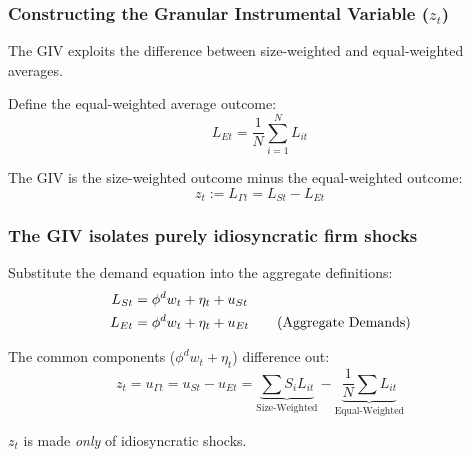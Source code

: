 \documentclass[aspectratio=169,11pt]{beamer}
\begin{document}
\begin{frame}
    \frametitle{Constructing the Granular Instrumental Variable ($z_t$)}

    \vspace{0.5cm}
    {\Large
        The GIV exploits the difference between size-weighted and equal-weighted averages.
    }

    \vspace{1cm}
    Define the equal-weighted average outcome:
    \begin{equation}
        L_{Et} = \frac{1}{N} \sum_{i=1}^N L_{it} \tag{Equal-Weighted Average} \label{eq:equal_weight_avg}
    \end{equation}

    \vspace{0.5cm}
    The GIV is the size-weighted outcome minus the equal-weighted outcome:
    \begin{equation}
        z_t := L_{\Gamma t} = L_{St} - L_{Et} \tag{GIV Definition} \label{eq:giv_def}
    \end{equation}

\end{frame}

\begin{frame}
    \frametitle{The GIV isolates purely idiosyncratic firm shocks}

    \vspace{0.5cm}
    Substitute the demand equation into the aggregate definitions:
    \begin{align}
        L_{St} & = \phi^d w_t + \eta_t + u_{St} \notag   \\
        L_{Et} & = \phi^d w_t + \eta_t + u_{Et} \tag{Aggregate Demands} \label{eq:agg_demands}
    \end{align}

    \vspace{0.5cm}
    The common components ($\phi^d w_t + \eta_t$) difference out:
    \begin{equation}
        z_t = u_{\Gamma t} = u_{St} - u_{Et} =\underbrace{\sum S_i L_{it}}_{\text{Size-Weighted}} - \underbrace{\frac{1}{N} \sum L_{it}}_{\text{Equal-Weighted}} \tag{Isolated Shocks} \label{eq:isolated_shocks}
    \end{equation}

    \vspace{0.5cm}
    {\Large
        $z_t$ is made \emph{only} of idiosyncratic shocks.
    }

\end{frame}
\end{document}
